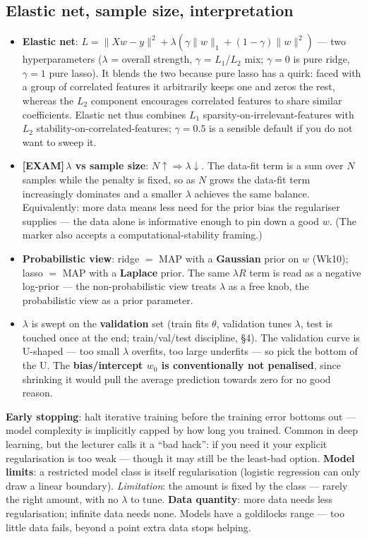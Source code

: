 \documentclass[11pt, a4paper]{article}
\newcommand{\examflag}{\textcolor{tipBd}{\textbf{[EXAM]}}\,}
\newcommand{\kw}[1]{\textbf{#1}}
\begin{document}
\subsection{Elastic net, sample size, interpretation}

\begin{itemize}
  \item \kw{Elastic net}: $L=\|Xw-y\|^2+\lambda(\gamma\|w\|_1+(1-\gamma)\|w\|^2)$ — two
  hyperparameters ($\lambda$ = overall strength, $\gamma$ = $L_1$/$L_2$ mix; $\gamma=0$ is pure
  ridge, $\gamma=1$ pure lasso). It blends the two because pure lasso has a quirk: faced with a
  group of correlated features it arbitrarily keeps one and zeros the rest, whereas the $L_2$
  component encourages correlated features to share similar coefficients. Elastic net thus combines
  $L_1$ sparsity-on-irrelevant-features with $L_2$ stability-on-correlated-features; $\gamma=0.5$ is
  a sensible default if you do not want to sweep it.
  \item \examflag{}\kw{$\lambda$ vs sample size}: $N\uparrow\Rightarrow\lambda\downarrow$. The
  data-fit term is a sum over $N$ samples while the penalty is fixed, so as $N$ grows the data-fit
  term increasingly dominates and a smaller $\lambda$ achieves the same balance. Equivalently: more
  data means less need for the prior bias the regulariser supplies — the data alone is informative
  enough to pin down a good $w$. (The marker also accepts a computational-stability framing.)
  \item \kw{Probabilistic view}: ridge $=$ MAP with a \kw{Gaussian} prior on $w$ (Wk10); lasso $=$
  MAP with a \kw{Laplace} prior. The same $\lambda R$ term is read as a negative log-prior — the
  non-probabilistic view treats $\lambda$ as a free knob, the probabilistic view as a prior
  parameter.
  \item $\lambda$ is swept on the \kw{validation} set (train fits $\theta$, validation tunes
  $\lambda$, test is touched once at the end; train/val/test discipline, §4). The validation curve
  is U-shaped — too small $\lambda$ overfits, too large underfits — so pick the bottom of the U.
  The \kw{bias/intercept $w_0$ is conventionally not penalised}, since shrinking it would pull the
  average prediction towards zero for no good reason.
\end{itemize}

\begin{notebox}
\kw{Early stopping}: halt iterative training before the training error bottoms out — model
complexity is implicitly capped by how long you trained. Common in deep learning, but the lecturer
calls it a ``bad hack'': if you need it your explicit regularisation is too weak — though it may
still be the least-bad option. \kw{Model limits}: a restricted model class is itself regularisation
(logistic regression can only draw a linear boundary). \emph{Limitation}: the amount is fixed by the
class — rarely the right amount, with no $\lambda$ to tune. \kw{Data quantity}: more data needs less
regularisation; infinite data needs none. Models have a goldilocks range — too little data fails,
beyond a point extra data stops helping.
\end{notebox}
\end{document}
